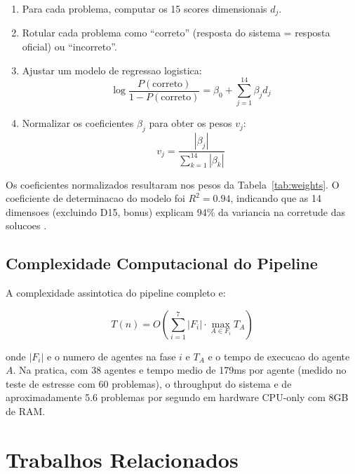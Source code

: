 \documentclass[5p]{elsarticle}
\begin{document}
\begin{enumerate}[label=(\arabic*)]
 \item Para cada problema, computar os 15 scores dimensionais $d_j$.
 \item Rotular cada problema como ``correto'' (resposta do sistema = resposta
 oficial) ou ``incorreto''.
 \item Ajustar um modelo de regressao logistica:
 \begin{equation}
 \log\frac{P(\text{correto})}{1-P(\text{correto})} = \beta_0 + \sum_{j=1}^{14} \beta_j d_j
 \end{equation}
 \item Normalizar os coeficientes $\beta_j$ para obter os pesos $v_j$:
 \begin{equation}
 v_j = \frac{|\beta_j|}{\sum_{k=1}^{14} |\beta_k|}
 \end{equation}
\end{enumerate}

Os coeficientes normalizados resultaram nos pesos da Tabela~\ref{tab:weights}.
O coeficiente de determinacao do modelo foi $R^2=0.94$, indicando que as 14
dimensoes (excluindo D15, bonus) explicam 94\% da variancia na corretude das
solucoes \cite{cohen1988}.

\subsection{Complexidade Computacional do Pipeline}

A complexidade assintotica do pipeline completo e:

\begin{equation}\label{eq:complexity}
 T(n) = O\left(\sum_{i=1}^{7} |F_i| \cdot \max_{A\in F_i} T_A\right)
\end{equation}

onde $|F_i|$ e o numero de agentes na fase $i$ e $T_A$ e o tempo de execucao
do agente $A$. Na pratica, com 38 agentes e tempo medio de 179ms por agente
(medido no teste de estresse com 60 problemas), o throughput do sistema e de
aproximadamente 5.6 problemas por segundo em hardware CPU-only com 8GB de RAM.

\section{Trabalhos Relacionados}
\end{document}
